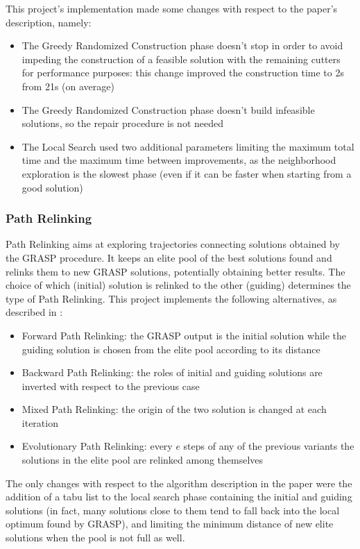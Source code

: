This project's implementation made some changes with respect to the paper's description, namely:
\begin{itemize}[itemsep=-1mm, topsep=0mm]
	\item The Greedy Randomized Construction phase doesn't stop in order to avoid impeding the construction of a feasible solution with the remaining cutters for performance purposes: this change improved the construction time to 2s from 21s (on average)
	\item The Greedy Randomized Construction phase doesn't build infeasible solutions, so the repair procedure is not needed
	\item The Local Search used two additional parameters limiting the maximum total time and the maximum time between improvements, as the neighborhood exploration is the slowest phase (even if it can be faster when starting from a good solution\cite{local_search})
\end{itemize}

\subsubsection{Path Relinking}
Path Relinking aims at exploring trajectories connecting solutions obtained by the GRASP procedure. It keeps an elite pool of the best solutions found and relinks them to new GRASP solutions, potentially obtaining better results. The choice of which (initial) solution is relinked to the other (guiding) determines the type of Path Relinking. This project implements the following alternatives, as described in \cite{grasp}:
\begin{itemize}[itemsep=-1mm, topsep=0mm]
	\item Forward Path Relinking: the GRASP output is the initial solution while the guiding solution is chosen from the elite pool according to its distance
	\item Backward Path Relinking: the roles of initial and guiding solutions are inverted with respect to the previous case
	\item Mixed Path Relinking: the origin of the two solution is changed at each iteration
	\item Evolutionary Path Relinking: every $e$ steps of any of the previous variants the solutions in the elite pool are relinked among themselves
\end{itemize}
The only changes with respect to the algorithm description in the paper were the addition of a tabu list to the local search phase containing the initial and guiding solutions (in fact, many solutions close to them tend to fall back into the local optimum found by GRASP), and limiting the minimum distance of new elite solutions when the pool is not full as well.

